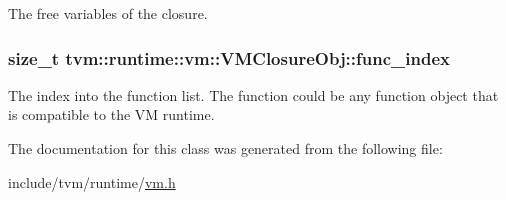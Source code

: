 The free variables of the closure. 

\subsubsection[{\texorpdfstring{func\+\_\+index}{func_index}}]{\setlength{\rightskip}{0pt plus 5cm}size\+\_\+t tvm\+::runtime\+::vm\+::\+V\+M\+Closure\+Obj\+::func\+\_\+index}\hypertarget{classtvm_1_1runtime_1_1vm_1_1VMClosureObj_af252588d00a4e0b7086edcea4cdfae6f}{}\label{classtvm_1_1runtime_1_1vm_1_1VMClosureObj_af252588d00a4e0b7086edcea4cdfae6f}


The index into the function list. The function could be any function object that is compatible to the VM runtime. 



The documentation for this class was generated from the following file\+:\begin{DoxyCompactItemize}
\item 
include/tvm/runtime/\hyperlink{vm_8h}{vm.\+h}\end{DoxyCompactItemize}
